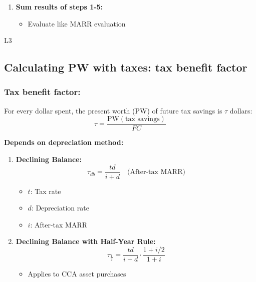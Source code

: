 \begin{process}
\begin{enumerate}
        \item \textbf{Sum results of steps 1-5:}
        \begin{itemize}
            \item Evaluate like MARR evaluation
        \end{itemize}
    \end{enumerate}
\end{process}

\begin{example}
    L3
\end{example}

\subsection{Calculating PW with taxes: tax benefit factor}
\subsubsection{Tax benefit factor:}
    \begin{definition}
        For every dollar spent, the present worth (PW) of future tax savings is $\tau$ dollars:
        \begin{equation}
            \tau = \frac{\text{PW}(\text{tax savings})}{FC}
        \end{equation}
        \vspace{1em}

        \textbf{Depends on depreciation method:}
        \begin{enumerate}
            \item \textbf{Declining Balance:}
            \begin{equation}
                \tau_{db} = \frac{td}{i + d} \quad \text{(After-tax MARR)}
            \end{equation}
            \begin{itemize}
                \item \( t \): Tax rate 
                \item \( d \): Depreciation rate
                \item \( i \): After-tax MARR
            \end{itemize}
            
            \item \textbf{Declining Balance with Half-Year Rule:}
            \begin{equation}
                \tau_{\frac{1}{2}} = \frac{td}{i + d} \cdot \frac{1 + i/2}{1 + i} 
            \end{equation}
            \begin{itemize}
                \item Applies to CCA asset purchases
            \end{itemize}
        \end{enumerate}
    \end{definition}

